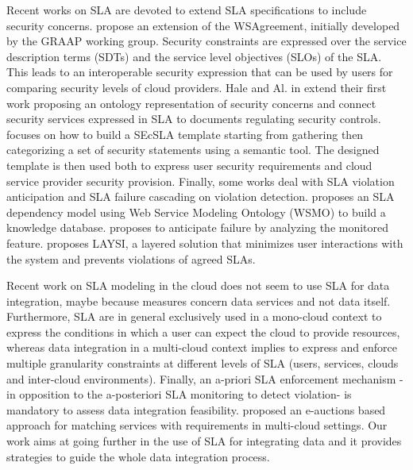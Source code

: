 
Recent  works on SLA are devoted to extend  SLA specifications to include  security concerns. 
\cite{6274042} propose an extension of the WSAgreement, initially developed by the GRAAP
working group. 
Security constraints are expressed over the service description
terms (SDTs) and the service level objectives (SLOs) of the SLA. 
This leads to an interoperable security expression that can be used by users for comparing security levels of cloud  providers. 
Hale and Al. in \cite{6655684} extend their first work proposing an ontology representation of security concerns and connect security services expressed in SLA  to documents regulating security controls.
\cite{LunaGarcia:2012:BCS:2381913.2381932} focuses on how to build a SEcSLA template starting from gathering then categorizing a set of security statements using a semantic tool. 
The designed template is then used both to express user security requirements and cloud service provider security provision.
Finally, some works  deal with SLA violation anticipation and SLA failure cascading on violation detection.  \cite{Dastjerdi:2012:DOA:2275356.2275360}  proposes an SLA dependency model using Web Service Modeling Ontology (WSMO) to build a knowledge database. 
\cite{5614035} proposes to anticipate failure by analyzing the monitored feature. 
\cite{5614035} proposes LAYSI, a layered solution that minimizes user interactions with the system and prevents violations of agreed SLAs.

 Recent work on SLA modeling in the cloud does not seem to use SLA for data integration, maybe because measures concern data services and not data itself.
Furthermore, SLA are in general exclusively used in a mono-cloud context to express the conditions in which a user can expect the cloud to provide resources, whereas data integration in a multi-cloud context implies to express and enforce multiple granularity constraints at different levels of SLA (users, services, clouds and inter-cloud environments).  
Finally,  an a-priori SLA enforcement mechanism -in opposition to the a-posteriori SLA monitoring to detect violation-  is mandatory to assess data integration feasibility. 
\cite{anisetti2014auctions} proposed an e-auctions based approach for matching services with requirements in multi-cloud settings. 
Our work aims at going further in the use of SLA for integrating data and it provides strategies to guide the whole data integration process.


